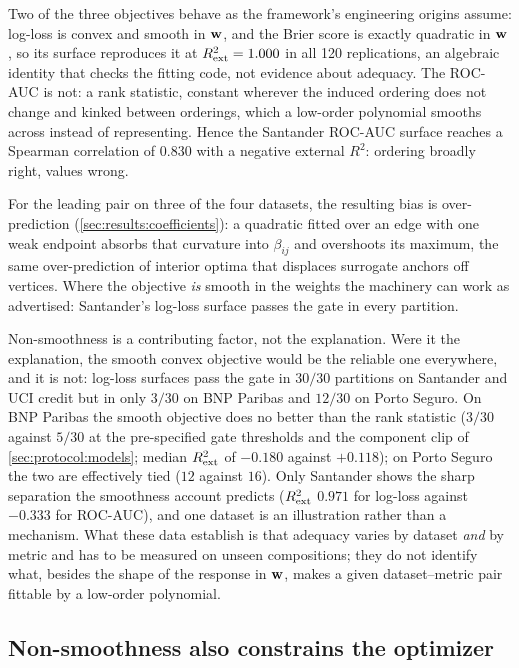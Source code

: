 Two of the three objectives behave as the framework's engineering origins assume: log-loss is convex and smooth in
$\mathbf{w}$, and the Brier score is exactly quadratic in $\mathbf{w}$, so its surface reproduces it at $R^{2}_{\mathrm{ext}} = 1.000$ in all
120 replications, an algebraic identity that checks the fitting code, not evidence about adequacy. The ROC-AUC is
not: a rank statistic, constant wherever the induced ordering does not change and kinked between orderings, which a
low-order polynomial smooths across instead of representing. Hence the Santander ROC-AUC surface reaches a Spearman
correlation of $0.830$ with a negative external $R^2$: ordering broadly right, values wrong.

For the leading pair on three of the four datasets, the resulting bias is over-prediction
(\cref{sec:results:coefficients}): a quadratic fitted over an edge with one weak endpoint absorbs that curvature into
$\beta_{ij}$ and overshoots its maximum, the same over-prediction of interior
optima that displaces surrogate anchors off vertices. Where the objective \emph{is} smooth in the weights the
machinery can work as advertised: Santander's log-loss surface passes the gate in every partition.

Non-smoothness is a contributing factor, not the explanation. Were it the explanation, the smooth convex objective
would be the reliable one everywhere, and it is not: log-loss surfaces pass the gate in $30/30$ partitions on
Santander and UCI credit but in only $3/30$ on BNP Paribas and $12/30$ on Porto Seguro. On BNP Paribas the smooth
objective does no better than the rank statistic ($3/30$ against $5/30$ at the pre-specified gate thresholds and the
component clip of \cref{sec:protocol:models}; median $R^{2}_{\mathrm{ext}}$ of $-0.180$ against $+0.118$); on Porto Seguro the two
are effectively tied ($12$ against $16$). Only Santander
shows the sharp separation the smoothness account predicts ($R^{2}_{\mathrm{ext}}$ $0.971$ for log-loss against $-0.333$ for
ROC-AUC), and one dataset is an illustration rather than a mechanism. What these data establish is that adequacy
varies by dataset \emph{and} by metric and has to be measured on unseen compositions; they do not identify what,
besides the shape of the response in $\mathbf{w}$, makes a given dataset--metric pair fittable by a low-order polynomial.

\subsection{Non-smoothness also constrains the optimizer}
\label{sec:disc:solver}

